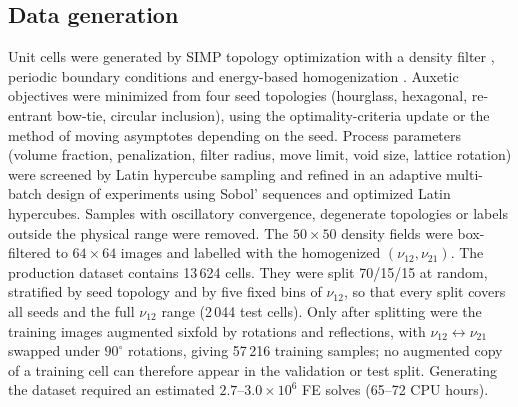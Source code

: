 \documentclass[a4paper,11pt]{article}
\newcommand{\nuot}{\nu_{12}}
\newcommand{\nuto}{\nu_{21}}
\begin{document}
\subsection{Data generation}
Unit cells were generated by SIMP topology optimization
\citep{bendsoe1989optimal,sigmund2001code,andreassen2011efficient} with a
density filter \citep{bourdin2001filters}, periodic boundary conditions and
energy-based homogenization
\citep{guedes1990preprocessing,andreassen2014homogenization,xia2015design}.
Auxetic objectives were minimized from four seed topologies (hourglass,
hexagonal, re-entrant bow-tie, circular inclusion), using the
optimality-criteria update or the method of moving asymptotes
\citep{svanberg1987mma} depending on the seed. Process parameters (volume
fraction, penalization, filter radius, move limit, void size, lattice
rotation) were screened by Latin hypercube sampling \citep{mckay1979lhs} and
refined in an adaptive multi-batch design of experiments using Sobol'
sequences \citep{sobol1967distribution} and optimized Latin hypercubes.
Samples with oscillatory convergence, degenerate topologies or labels outside
the physical range were removed. The $50\times50$ density fields were
box-filtered to $64\times64$ images and labelled with the homogenized
$(\nuot,\nuto)$. The production dataset contains 13\,624 cells. They were
split 70/15/15 at random, stratified by seed topology and by five fixed
bins of $\nuot$, so that every split covers all seeds and the full
$\nuot$ range (2\,044 test cells). Only after splitting were the training
images augmented sixfold by rotations and reflections, with
$\nuot\leftrightarrow\nuto$ swapped under $90^{\circ}$ rotations, giving
57\,216 training samples; no augmented copy of a training cell can therefore
appear in the validation or test split. Generating the dataset required an
estimated $2.7$--$3.0\times10^{6}$ FE solves (65--72 CPU hours).
\end{document}

